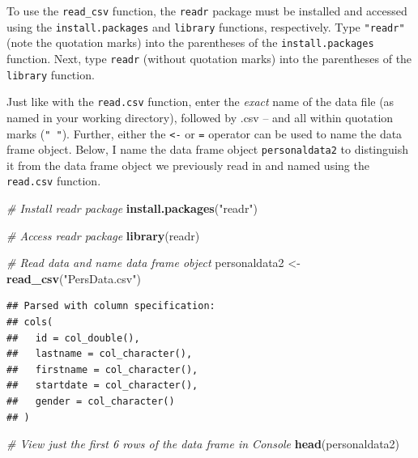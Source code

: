 \documentclass[]{book}
\newenvironment{Shaded}{\begin{snugshade}}{\end{snugshade}}
\newcommand{\KeywordTok}[1]{\textcolor[rgb]{0.13,0.29,0.53}{\textbf{#1}}}
\newcommand{\StringTok}[1]{\textcolor[rgb]{0.31,0.60,0.02}{#1}}
\newcommand{\CommentTok}[1]{\textcolor[rgb]{0.56,0.35,0.01}{\textit{#1}}}
\newcommand{\NormalTok}[1]{#1}
\begin{document}
To use the \texttt{read\_csv} function, the \texttt{readr} package must
be installed and accessed using the \texttt{install.packages} and
\texttt{library} functions, respectively. Type \texttt{"readr"} (note
the quotation marks) into the parentheses of the
\texttt{install.packages} function. Next, type \texttt{readr} (without
quotation marks) into the parentheses of the \texttt{library} function.

Just like with the \texttt{read.csv} function, enter the \emph{exact}
name of the data file (as named in your working directory), followed by
.csv -- and all within quotation marks (\texttt{"\ "}). Further, either
the \texttt{\textless{}-} or \texttt{=} operator can be used to name the
data frame object. Below, I name the data frame object
\texttt{personaldata2} to distinguish it from the data frame object we
previously read in and named using the \texttt{read.csv} function.

\begin{Shaded}
\begin{Highlighting}[]
\CommentTok{# Install readr package}
\KeywordTok{install.packages}\NormalTok{(}\StringTok{"readr"}\NormalTok{)}
\end{Highlighting}
\end{Shaded}

\begin{Shaded}
\begin{Highlighting}[]
\CommentTok{# Access readr package}
\KeywordTok{library}\NormalTok{(readr)}

\CommentTok{# Read data and name data frame object}
\NormalTok{personaldata2 <-}\StringTok{ }\KeywordTok{read_csv}\NormalTok{(}\StringTok{"PersData.csv"}\NormalTok{)}
\end{Highlighting}
\end{Shaded}

\begin{verbatim}
## Parsed with column specification:
## cols(
##   id = col_double(),
##   lastname = col_character(),
##   firstname = col_character(),
##   startdate = col_character(),
##   gender = col_character()
## )
\end{verbatim}

\begin{Shaded}
\begin{Highlighting}[]
\CommentTok{# View just the first 6 rows of the data frame in Console}
\KeywordTok{head}\NormalTok{(personaldata2)}
\end{Highlighting}
\end{Shaded}
\end{document}
